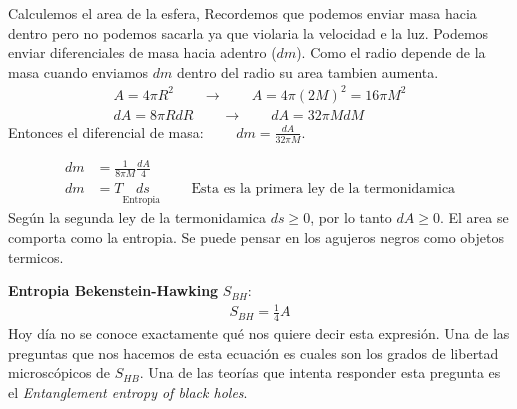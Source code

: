 \documentclass{article}
\begin{document}
\hfill

Calculemos el area de la esfera, Recordemos que podemos enviar masa hacia dentro pero no podemos sacarla ya que violaria la velocidad e la luz. Podemos enviar diferenciales de masa hacia adentro ($ dm  $). Como el radio depende de la masa cuando enviamos $ dm  $ dentro del radio su area tambien aumenta. 
\begin{gather*}
  A = 4\pi R^2 \qquad \rightarrow \qquad A = 4\pi(2M)^2 = 16 \pi M^2 \\
  dA = 8\pi R dR \qquad \rightarrow \qquad dA = 32\pi M dM
\end{gather*}
Entonces el diferencial de masa: $\qquad  dm = \displaystyle\frac{dA }{32 \pi M } $.

\begin{align*}
  dm &= \displaystyle\frac{1 }{8\pi M } \displaystyle\frac{dA }{4 }\\
  dm &= T \underset{\text{Entropia }}{ds } \qquad \text{Esta es la primera ley de la termonidamica}
\end{align*}
Según la segunda ley de la termonidamica $ ds \geq 0  $, por lo tanto  $ dA \geq 0  $. El area se comporta como la entropia. Se puede pensar en los agujeros negros como objetos termicos.

\textbf{Entropia Bekenstein-Hawking } $ S _{BH }  $:
\begin{gather*}
  S _{BH } = \displaystyle\frac{1 }{4 } A  
\end{gather*}
Hoy día no se conoce exactamente qué nos quiere decir esta expresión. Una de las preguntas que nos hacemos de esta ecuación es cuales son los grados de libertad microscópicos de $ S _{HB }  $. Una de las teorías que intenta responder esta pregunta es el \textit{Entanglement entropy of black holes}.
\end{document}
